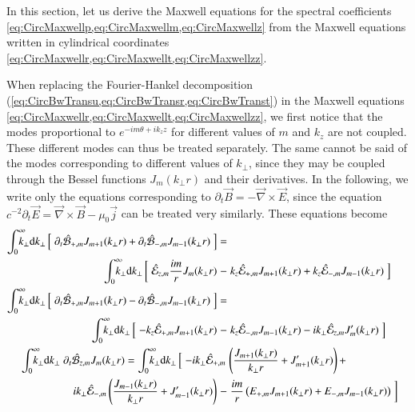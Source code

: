 In this section, let us derive the Maxwell equations for the spectral
coefficients \cref{eq:CircMaxwellp,eq:CircMaxwellm,eq:CircMaxwellz}
from the Maxwell equations written in cylindrical coordinates \cref{eq:CircMaxwellr,eq:CircMaxwellt,eq:CircMaxwellzz}.

When replacing the Fourier-Hankel decomposition
(\cref{eq:CircBwTransu,eq:CircBwTransr,eq:CircBwTranst}) in the
Maxwell equations \cref{eq:CircMaxwellr,eq:CircMaxwellt,eq:CircMaxwellzz}, we
first notice that the modes proportional to $e^{-im\theta +ik_z z}$ for different
values of $m$ and $k_z$ are not coupled. These different modes can
thus be treated separately. The same cannot be said of the modes
corresponding to different values of $k_\perp $, since they may be coupled
through the Bessel functions $J_m(k_\perp r)$ and their derivatives. 
In the following, we write only the equations corresponding to $\partial_t \vec{B} =
-\vec{\nabla}\times \vec{E}$, since the equation $c^{-2}\partial_t \vec{E} =
\vec{\nabla}\times\vec{B} - \mu_0 \vec{j}$ can be treated very
similarly. These equations become
\begin{subequations}
\begin{align}
\RInteg{k_\perp } \left[ \; \partial_t \spectral{B}_{+,m}  J_{m+1}(k_\perp r)
  + \partial_t \spectral{B}_{-,m}  J_{m-1}(k_\perp r) \; \right] =&&
\nonumber \\ 
\qquad \RInteg{k_\perp } \left[ \; \spectral{E}_{z,m} \frac{im}{r}
  J_m(k_\perp r) \right.-&\left.
  k_z\spectral{E}_{+,m}J_{m+1}(k_\perp r) + k_z\spectral{E}_{-,m}J_{m-1}(k_\perp r) \;
\right] & \\
\RInteg{k_\perp } \left[ \; \partial_t \spectral{B}_{+,m}  J_{m+1}(k_\perp r)
  - \partial_t \spectral{B}_{-,m}  J_{m-1}(k_\perp r) \; \right] =&&
\nonumber \\
 \RInteg{k_\perp } \left[ \; -k_z\spectral{E}_{+,m}J_{m+1}(k_\perp r)
 \right.-&\left.  k_z\spectral{E}_{-,m}J_{m-1}(k_\perp r) - ik_\perp \spectral{E}_{z,m} J_m'(k_\perp r) \;\right] \\
\RInteg{k_\perp }\; \partial_t \spectral{B}_{z,m}  J_{m}(k_\perp r) =
\RInteg{k_\perp } \left[ \; -ik_\perp
  \spectral{E}_{+,m}\right.&\left(\frac{J_{m+1}(k_\perp r)}{k_\perp r} +
    J_{m+1}'(k_\perp r) \right) + & \nonumber \\
\left. ik_\perp \spectral{E}_{-,m}\left(\frac{J_{m-1}(k_\perp r)}{k_\perp r} +
    J_{m-1}'(k_\perp r) \right) \right.-&\left. \frac{im}{r} \left( E_{+,m} J_{m+1}(k_\perp r) +
    E_{-,m} J_{m-1}(k_\perp r) \right) \;\right] 
\end{align}
\end{subequations}
